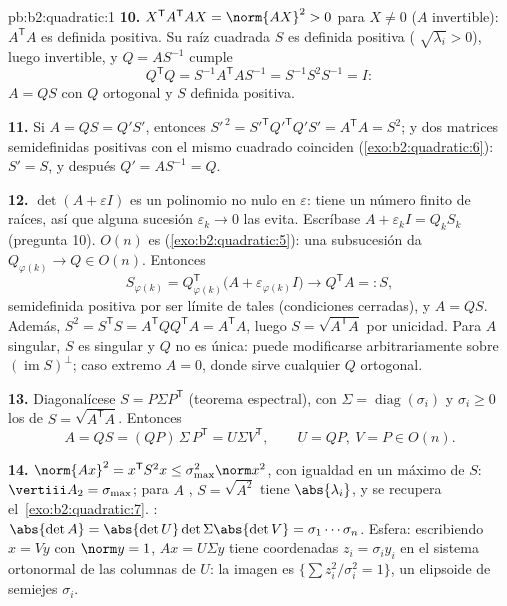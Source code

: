 \begin{solution}{pb:b2:quadratic:1}
\textbf{10.} $X^{\mathsf T}A^{\mathsf T}AX = \norm{AX}^2 > 0$ para $X
\neq 0$ ($A$ invertible): $A^{\mathsf T}A$ es definida positiva. Su
raíz cuadrada $S$ es definida positiva (
$\sqrt{\lambda_i} > 0$), luego invertible, y $Q = AS^{-1}$ cumple
\[
Q^{\mathsf T}Q = S^{-1}A^{\mathsf T}AS^{-1}
= S^{-1}S^2S^{-1} = I :
\]
$A = QS$ con $Q$ ortogonal y $S$ definida positiva.

\textbf{11.} Si $A = QS = Q'S'$, entonces $S'^{\,2} = S'^{\mathsf
T}Q'^{\mathsf T}Q'S' = A^{\mathsf T}A = S^2$; y dos matrices
semidefinidas positivas con el mismo cuadrado coinciden
(\cref{exo:b2:quadratic:6}): $S' = S$, y después $Q' = AS^{-1} = Q$.

\textbf{12.} $\det(A + \varepsilon I)$ es un polinomio no nulo en
$\varepsilon$: tiene un número finito de raíces, así que alguna
sucesión $\varepsilon_k \to 0$ las evita. Escríbase $A + \varepsilon_kI
= Q_kS_k$ (pregunta 10). $O(n)$ es 
(\cref{exo:b2:quadratic:5}): una subsucesión da $Q_{\varphi(k)} \to Q
\in O(n)$. Entonces
\[
S_{\varphi(k)} = Q_{\varphi(k)}^{\mathsf T}
\bigl(A + \varepsilon_{\varphi(k)}I\bigr)
\longrightarrow Q^{\mathsf T}A =: S,
\]
 semidefinida positiva por ser límite de tales (condiciones
cerradas), y $A = QS$. Además, $S^2 = S^{\mathsf T}S = A^{\mathsf
T}QQ^{\mathsf T}A = A^{\mathsf T}A$, luego $S = \sqrt{A^{\mathsf T}A}$
por unicidad. Para $A$ singular, $S$ es singular y $Q$ no es única:
puede modificarse arbitrariamente sobre $(\operatorname{im}
S)^{\perp}$; caso extremo $A = 0$, donde sirve cualquier $Q$ ortogonal.

\textbf{13.} Diagonalícese $S = P\Sigma P^{\mathsf T}$ (teorema
espectral), con $\Sigma = \operatorname{diag}(\sigma_i)$ y $\sigma_i
\geq 0$ los  de $S = \sqrt{A^{\mathsf T}A}$. Entonces
\[
A = QS = (QP)\,\Sigma\,P^{\mathsf T} = U\Sigma V^{\mathsf T},
\qquad U = QP,\ V = P \in O(n) .
\]

\textbf{14.} $\norm{Ax}^2 = x^{\mathsf T}S^2x \leq
\sigma_{\max}^2\norm x^2$, con igualdad en un  máximo de
$S$: $\vertiii A_2 = \sigma_{\max}$; para $A$ , $S =
\sqrt{A^2}$ tiene  $\abs{\lambda_i}$, y se recupera el~\cref{exo:b2:quadratic:7}. : $\abs{\det A} = \abs{\det
U}\det\Sigma\abs{\det V} = \sigma_1\cdots\sigma_n$. Esfera: escribiendo
$x = Vy$ con $\norm y = 1$, $Ax = U\Sigma y$ tiene coordenadas $z_i =
\sigma_iy_i$ en el sistema ortonormal de las columnas de $U$: la imagen
es $\{\sum z_i^2/\sigma_i^2 = 1\}$, un elipsoide de semiejes
$\sigma_i$.


\end{solution}
